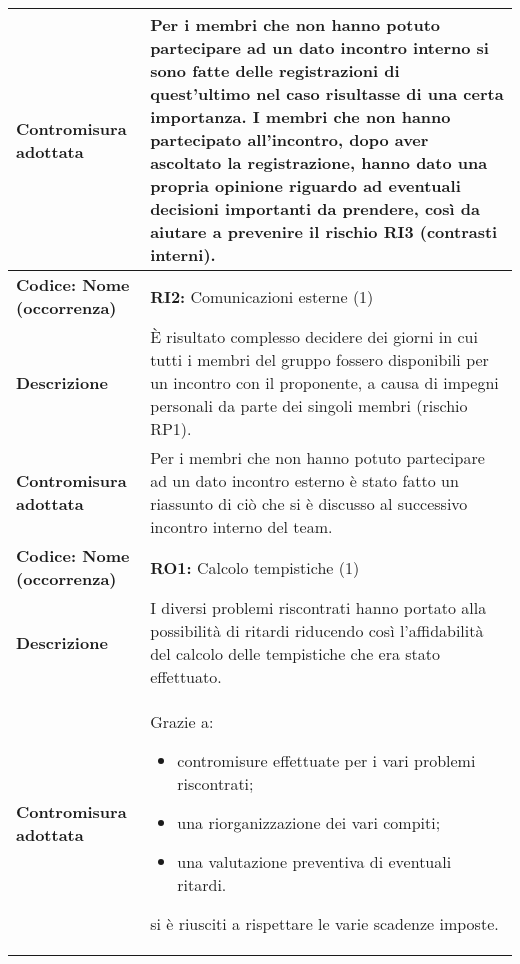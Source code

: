 {\begin{longtable}{C{3.5cm} | C{11cm}}
\textbf{Contromisura adottata} & Per i membri che non hanno potuto partecipare ad un dato incontro interno si sono fatte delle registrazioni di quest'ultimo nel caso risultasse di una certa importanza. I membri che non hanno partecipato all'incontro, dopo aver ascoltato la registrazione, hanno dato una propria opinione riguardo ad eventuali decisioni importanti da prendere, così da aiutare a prevenire il rischio RI3 (contrasti interni).\\
\hline
\hline
{}\textbf{Codice: Nome (occorrenza)} & \textbf{RI2: }{Comunicazioni esterne (1)}\\ 
\textbf{Descrizione} & È risultato complesso decidere dei giorni in cui tutti i membri del gruppo fossero disponibili per un incontro con il proponente, a causa di impegni personali da parte dei singoli membri (rischio RP1).\\ 
\textbf{Contromisura adottata} & Per i membri che non hanno potuto partecipare ad un dato incontro esterno è stato fatto un riassunto di ciò che si è discusso al successivo incontro interno del team.\\
\hline
\hline
{}\textbf{Codice: Nome (occorrenza)} & \textbf{RO1: }{Calcolo tempistiche (1)}\\
\textbf{Descrizione} & I diversi problemi riscontrati hanno portato alla possibilità di ritardi riducendo così l'affidabilità del calcolo delle tempistiche che era stato effettuato.\\
\textbf{Contromisura adottata} & Grazie a: 
\begin{itemize}
\item contromisure effettuate per i vari problemi riscontrati;
\item una riorganizzazione dei vari compiti;
\item una valutazione preventiva di eventuali ritardi.
\end{itemize} 
si è riusciti a rispettare le varie scadenze imposte.\\
\hline
\hline
\end{longtable}
}
